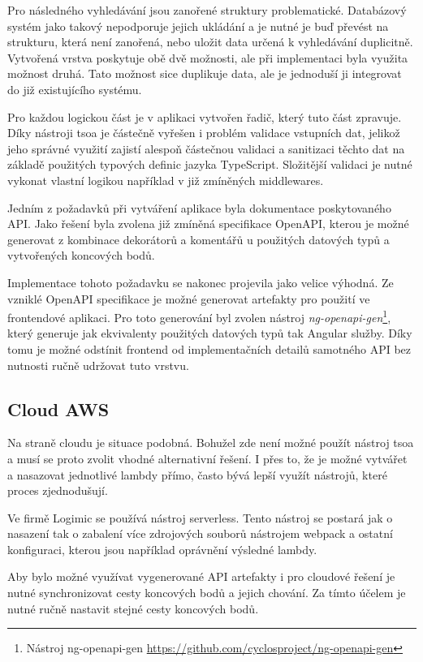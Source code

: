 Pro následného vyhledávání jsou zanořené struktury problematické. Databázový systém jako takový nepodporuje jejich ukládání a je nutné je buď převést na strukturu, která není zanořená, nebo uložit data určená k vyhledávání duplicitně. Vytvořená vrstva poskytuje obě dvě možnosti, ale při implementaci byla využita možnost druhá. Tato možnost sice duplikuje data, ale je jednoduší ji integrovat do již existujícího systému.

Pro každou logickou část je v aplikaci vytvořen řadič, který tuto část zpravuje. Díky nástroji tsoa je částečně vyřešen i problém validace vstupních dat, jelikož jeho správné využití zajistí alespoň částečnou validaci a sanitizaci těchto dat na základě použitých typových definic jazyka TypeScript. Složitější validaci je nutné vykonat vlastní logikou například v již zmíněných middlewares.

Jedním z požadavků při vytváření aplikace byla dokumentace poskytovaného API. Jako řešení byla zvolena již zmíněná specifikace OpenAPI, kterou je možné generovat z kombinace dekorátorů a komentářů u použitých datových typů a vytvořených koncových bodů. 

Implementace tohoto požadavku se nakonec projevila jako velice výhodná. Ze vzniklé OpenAPI specifikace je možné generovat artefakty pro použití ve frontendové aplikaci. Pro toto generování byl zvolen nástroj \emph{ng-openapi-gen}\footnote{Nástroj ng-openapi-gen \url{https://github.com/cyclosproject/ng-openapi-gen}}, který generuje jak ekvivalenty použitých datových typů tak Angular služby. Díky tomu je možné odstínit frontend od implementačních detailů samotného API bez nutnosti ručně udržovat tuto vrstvu.

\subsection{Cloud AWS}
Na straně cloudu je situace podobná. Bohužel zde není možné použít nástroj tsoa a musí se proto zvolit vhodné alternativní řešení. I přes to, že je možné vytvářet a nasazovat jednotlivé lambdy přímo, často bývá lepší využít nástrojů, které proces zjednodušují. 

Ve firmě Logimic se používá nástroj serverless. Tento nástroj se postará jak o nasazení tak o zabalení více zdrojových souborů nástrojem webpack a ostatní konfiguraci, kterou jsou například oprávnění výsledné lambdy.

Aby bylo možné využívat vygenerované API artefakty i pro cloudové řešení je nutné synchronizovat cesty koncových bodů a jejich chování. Za tímto účelem je nutné ručně nastavit stejné cesty koncových bodů.

